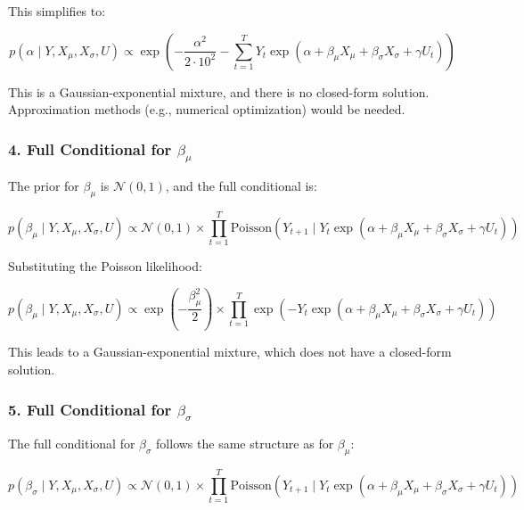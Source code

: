 \documentclass[
  letterpaper,
  DIV=11,
  numbers=noendperiod]{scrartcl}
\begin{document}
This simplifies to:

\begin{equation}
p(\alpha \mid Y, X_{\mu}, X_{\sigma}, U) \propto \exp\left( -\frac{\alpha^2}{2 \cdot 10^2} - \sum_{t=1}^{T} Y_t \exp(\alpha + \beta_{\mu} X_{\mu} + \beta_{\sigma} X_{\sigma} + \gamma U_t) \right)
\end{equation}

This is a Gaussian-exponential mixture, and there is no closed-form
solution. Approximation methods (e.g., numerical optimization) would be
needed.

\subsubsection{\texorpdfstring{4. Full Conditional for
\(\beta_{\mu}\)}{4. Full Conditional for \textbackslash beta\_\{\textbackslash mu\}}}\label{full-conditional-for-beta_mu}

The prior for \(\beta_{\mu}\) is \(\mathcal{N}(0, 1)\), and the full
conditional is:

\begin{equation}
p(\beta_{\mu} \mid Y, X_{\mu}, X_{\sigma}, U) \propto \mathcal{N}(0, 1) \times \prod_{t=1}^{T} \text{Poisson}(Y_{t+1} \mid Y_t \exp(\alpha + \beta_{\mu} X_{\mu} + \beta_{\sigma} X_{\sigma} + \gamma U_t))
\end{equation}

Substituting the Poisson likelihood:

\begin{equation}
p(\beta_{\mu} \mid Y, X_{\mu}, X_{\sigma}, U) \propto \exp\left( -\frac{\beta_{\mu}^2}{2} \right) \times \prod_{t=1}^{T} \exp\left( -Y_t \exp(\alpha + \beta_{\mu} X_{\mu} + \beta_{\sigma} X_{\sigma} + \gamma U_t) \right)
\end{equation}

This leads to a Gaussian-exponential mixture, which does not have a
closed-form solution.

\subsubsection{\texorpdfstring{5. Full Conditional for
\(\beta_{\sigma}\)}{5. Full Conditional for \textbackslash beta\_\{\textbackslash sigma\}}}\label{full-conditional-for-beta_sigma}

The full conditional for \(\beta_{\sigma}\) follows the same structure
as for \(\beta_{\mu}\):

\begin{equation}
p(\beta_{\sigma} \mid Y, X_{\mu}, X_{\sigma}, U) \propto \mathcal{N}(0, 1) \times \prod_{t=1}^{T} \text{Poisson}(Y_{t+1} \mid Y_t \exp(\alpha + \beta_{\mu} X_{\mu} + \beta_{\sigma} X_{\sigma} + \gamma U_t))
\end{equation}
\end{document}
